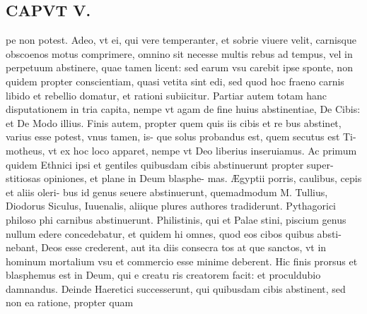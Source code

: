 \documentclass{article}
\begin{document}
\begin{pages}
\section*{CAPVT  V. }
\marginpar{[ p.373 ]}\pstart pe non potest. Adeo, vt ei, qui vere temperanter, et sobrie viuere velit, carnisque obscoenos motus comprimere, omnino sit necesse multis rebus ad tempus, vel in perpetuum abstinere, quae tamen licent: sed earum vsu carebit ipse sponte, non quidem propter conscientiam, quasi vetita sint edi, sed quod hoc fraeno carnis libido et rebellio domatur, et rationi subiicitur. Partiar autem totam hanc disputationem in tria capita, nempe vt agam de fine huius abstinentiae, De Cibis: et De Modo illius. Finis autem, propter quem quis iis cibis et re bus abstinet, varius esse potest, vnus tamen, is- que solus probandus est, quem secutus est Ti- motheus, vt ex hoc loco apparet, nempe vt Deo liberius inseruiamus. Ac primum quidem Ethnici ipsi et gentiles quibusdam cibis abstinuerunt propter super- stitiosas opiniones, et plane in Deum blasphe- mas. Ægyptii porris, caulibus, cepis et aliis oleri- bus id genus seuere abstinuerunt, quemadmodum M. Tullius, Diodorus Siculus, Iuuenalis, aliique plures authores tradiderunt. Pythagorici philoso phi carnibus abstinuerunt. Philistinis, qui et Palae stini, piscium genus nullum edere concedebatur, et quidem hi omnes, quod eos cibos quibus absti- nebant, Deos esse crederent, aut ita diis consecra tos at que sanctos, vt in hominum mortalium vsu et commercio esse minime deberent. Hic finis prorsus et blasphemus est in Deum, qui e creatu ris creatorem facit: et proculdubio damnandus. Deinde Haeretici successerunt, qui quibusdam cibis abstinent, sed non ea ratione, propter quam  \pend

\end{pages}
\end{document}
